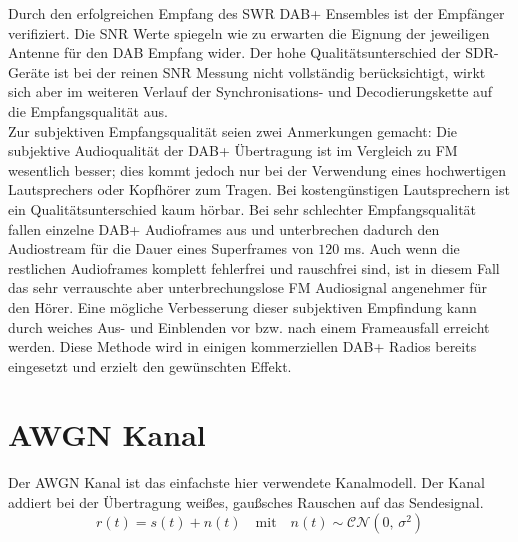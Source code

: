 Durch den erfolgreichen Empfang des SWR DAB+ Ensembles ist der Empfänger verifiziert. Die SNR Werte spiegeln wie zu erwarten die Eignung der jeweiligen Antenne für den DAB Empfang wider. Der hohe Qualitätsunterschied der SDR-Geräte ist bei der reinen SNR Messung nicht vollständig berücksichtigt, wirkt sich aber im weiteren Verlauf der Synchronisations- und Decodierungskette auf die Empfangsqualität aus.\\
Zur subjektiven Empfangsqualität seien zwei Anmerkungen gemacht: Die subjektive Audioqualität der DAB+ Übertragung ist im Vergleich zu FM wesentlich besser; dies kommt jedoch nur bei der Verwendung eines hochwertigen Lautsprechers oder Kopfhörer zum Tragen. Bei kostengünstigen Lautsprechern ist ein Qualitätsunterschied kaum hörbar. Bei sehr schlechter Empfangsqualität fallen einzelne DAB+ Audioframes aus und unterbrechen dadurch den Audiostream für die Dauer eines Superframes von $120$ ms. Auch wenn die restlichen Audioframes komplett fehlerfrei und rauschfrei sind, ist in diesem Fall das sehr verrauschte aber unterbrechungslose FM Audiosignal angenehmer für den Hörer. Eine mögliche Verbesserung dieser subjektiven Empfindung kann durch weiches Aus- und Einblenden vor bzw. nach einem Frameausfall erreicht werden. Diese Methode wird in einigen kommerziellen DAB+ Radios bereits eingesetzt und erzielt den gewünschten Effekt.


\section{AWGN Kanal}
Der \ac{AWGN} Kanal ist das einfachste hier verwendete Kanalmodell. Der Kanal addiert bei der Übertragung weißes, gaußsches Rauschen auf das Sendesignal.
\begin{equation}
r(t) = s(t) + n(t) \quad \text{mit} \quad n(t) \sim \mathcal{C}\mathcal{N}(0,\,\sigma^{2})
\end{equation}

